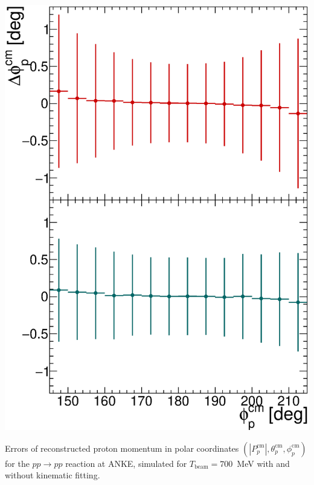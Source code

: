 \includegraphics[height=0.7\textheight]{pics/drawPhi.eps}

Errors of reconstructed proton momentum in polar coordinates $(|P_p^\mathrm{cm}|, \theta_p^\mathrm{cm}, \phi_p^\mathrm{cm})$ for the $pp \to pp$ reaction at ANKE, simulated for $T_\mathrm{beam} = 700$~MeV with and without kinematic fitting.
